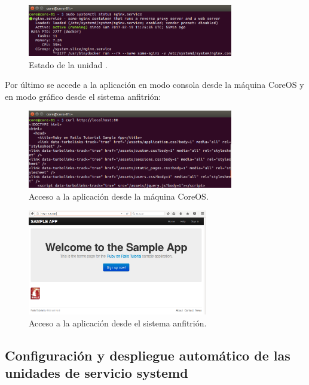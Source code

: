 \begin{figure}[H]
\centering
\includegraphics[width=0.8\textwidth]{images/figures/nginx.service.png}
\caption{Estado de la unidad .}
\end{figure}

Por último se accede a la aplicación en modo consola desde la máquina CoreOS y en modo gráfico desde el sistema anfitrión:

\begin{figure}[H]
\centering
\includegraphics[width=0.8\textwidth]{images/figures/coreosmanualcurl.png}
\caption{Acceso a la aplicación desde la máquina CoreOS.}
\end{figure}

\begin{figure}[H]
\centering
\includegraphics[width=0.7\textwidth]{images/figures/coreosmanualhost.png}
\caption{Acceso a la aplicación desde el sistema anfitrión.}
\end{figure}

\subsection{Configuración y despliegue automático de las unidades de servicio systemd}

